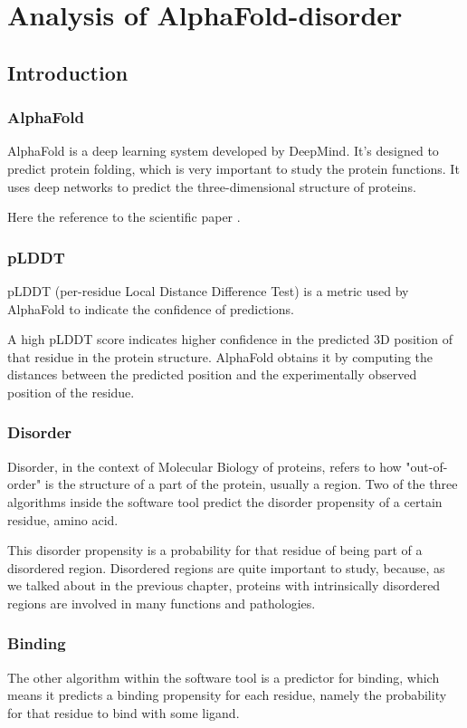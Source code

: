 \chapter{Analysis of AlphaFold-disorder}
\label{chp:alphafold-disorder}


\section{Introduction}

\subsection{AlphaFold}
AlphaFold is a deep learning system developed by DeepMind. It's designed to predict protein folding, which is very important to study the protein functions. It uses deep networks to predict the three-dimensional structure of proteins.

Here the reference to the scientific paper \cite{Alpha}.

\subsection{pLDDT}

pLDDT (per-residue Local Distance Difference Test) is a metric used by AlphaFold to indicate the confidence of predictions.

A high pLDDT score indicates higher confidence in the predicted 3D position of that residue in the protein structure. AlphaFold obtains it by computing the distances between the predicted position and the experimentally observed position of the residue.


\subsection{Disorder}
Disorder, in the context of Molecular Biology of proteins, refers to how "out-of-order" is the structure of a part of the protein, usually a region. Two of the three algorithms inside the software tool predict the disorder propensity of a certain residue, amino acid. 

This disorder propensity is a probability for that residue of being part of a disordered region. Disordered regions are quite important to study, because, as we talked about in the previous chapter, proteins with intrinsically disordered regions are involved in many functions and pathologies.

\subsection{Binding}
The other algorithm within the software tool is a predictor for binding, which means it predicts a binding propensity for each residue, namely the probability for that residue to bind with some ligand.

